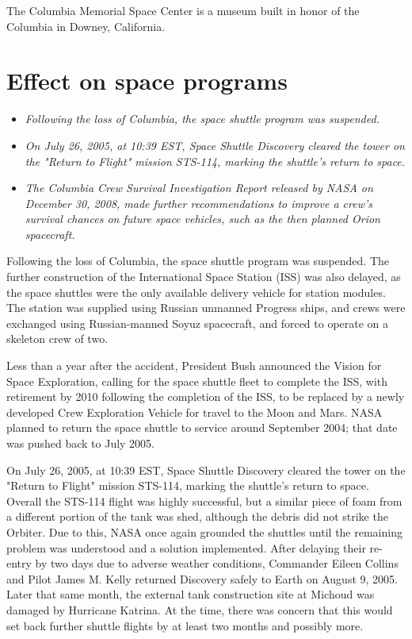 The Columbia Memorial Space Center is a museum built in honor of the
Columbia in Downey, California.

\section{Effect on space programs}\label{effect-on-space-programs}

\begin{itemize}
\item
  \emph{Following the loss of Columbia, the space shuttle program was
  suspended.}
\item
  \emph{On July 26, 2005, at 10:39 EST, Space Shuttle Discovery cleared
  the tower on the "Return to Flight" mission STS-114, marking the
  shuttle's return to space.}
\item
  \emph{The Columbia Crew Survival Investigation Report released by NASA
  on December 30, 2008, made further recommendations to improve a crew's
  survival chances on future space vehicles, such as the then planned
  Orion spacecraft.}
\end{itemize}

Following the loss of Columbia, the space shuttle program was suspended.
The further construction of the International Space Station (ISS) was
also delayed, as the space shuttles were the only available delivery
vehicle for station modules. The station was supplied using Russian
unmanned Progress ships, and crews were exchanged using Russian-manned
Soyuz spacecraft, and forced to operate on a skeleton crew of two.

Less than a year after the accident, President Bush announced the Vision
for Space Exploration, calling for the space shuttle fleet to complete
the ISS, with retirement by 2010 following the completion of the ISS, to
be replaced by a newly developed Crew Exploration Vehicle for travel to
the Moon and Mars. NASA planned to return the space shuttle to service
around September 2004; that date was pushed back to July 2005.

On July 26, 2005, at 10:39 EST, Space Shuttle Discovery cleared the
tower on the "Return to Flight" mission STS-114, marking the shuttle's
return to space. Overall the STS-114 flight was highly successful, but a
similar piece of foam from a different portion of the tank was shed,
although the debris did not strike the Orbiter. Due to this, NASA once
again grounded the shuttles until the remaining problem was understood
and a solution implemented. After delaying their re-entry by two days
due to adverse weather conditions, Commander Eileen Collins and Pilot
James M. Kelly returned Discovery safely to Earth on August 9, 2005.
Later that same month, the external tank construction site at Michoud
was damaged by Hurricane Katrina. At the time, there was concern that
this would set back further shuttle flights by at least two months and
possibly more.

